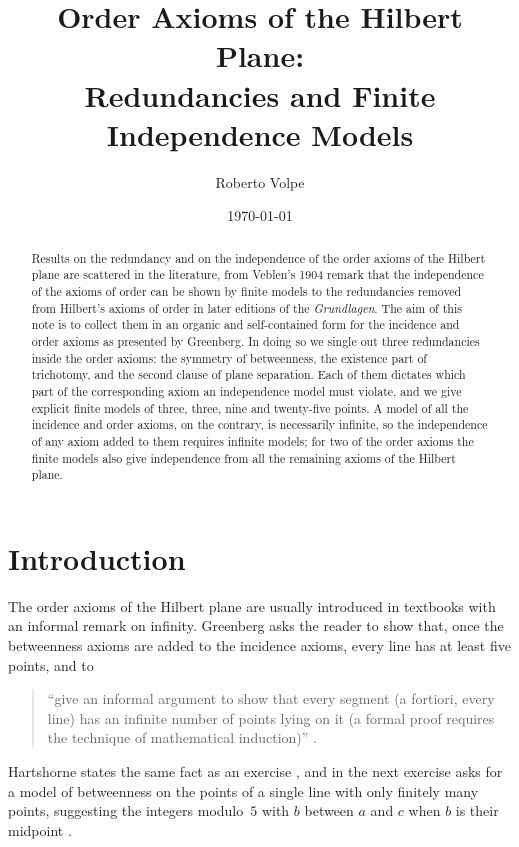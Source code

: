 \documentclass[11pt]{amsart}
\title[Finite models for the order axioms]{Order Axioms of the Hilbert Plane:\\ Redundancies and Finite Independence Models}
\author{Roberto Volpe}
\date{\today}
\theoremstyle{definition}
\theoremstyle{remark}
\begin{document}
\begin{abstract}
Results on the redundancy and on the independence of the order axioms of the Hilbert plane are scattered in the literature, from Veblen's 1904 remark that the independence of the axioms of order can be shown by finite models to the redundancies removed from Hilbert's axioms of order in later editions of the \emph{Grundlagen}. The aim of this note is to collect them in an organic and self-contained form for the incidence and order axioms as presented by Greenberg. In doing so we single out three redundancies inside the order axioms: the symmetry of betweenness, the existence part of trichotomy, and the second clause of plane separation. Each of them dictates which part of the corresponding axiom an independence model must violate, and we give explicit finite models of three, three, nine and twenty-five points. A model of all the incidence and order axioms, on the contrary, is necessarily infinite, so the independence of any axiom added to them requires infinite models; for two of the order axioms the finite models also give independence from all the remaining axioms of the Hilbert plane.
\end{abstract}
\maketitle

\section{Introduction}

The order axioms of the Hilbert plane are usually introduced in textbooks with an informal remark on infinity. Greenberg asks the reader to show that, once the betweenness axioms are added to the incidence axioms, every line has at least five points, and to
\begin{quote}
``give an informal argument to show that every segment (a fortiori, every line) has an infinite number of points lying on it (a formal proof requires the technique of mathematical induction)'' \cite[Chapter~3, Exercise~8]{Gre}.
\end{quote}
Hartshorne states the same fact as an exercise \cite[Exercise~7.4]{Har}, and in the next exercise asks for a model of betweenness on the points of a single line with only finitely many points, suggesting the integers modulo~$5$ with $b$ between $a$ and $c$ when $b$ is their midpoint \cite[Exercise~7.5]{Har}.
\end{document}
